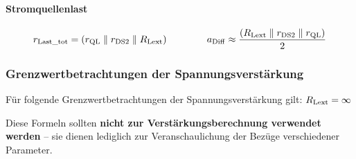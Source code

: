 

\paragraph{Stromquellenlast}    %

\vspace{-0.2cm}



\[
    r_{\rm Last\_tot} =  \left( r_{\rm QL} \parallel r_{\rm DS2} \parallel R_{\rm Lext} \right) \qquad \qquad
    a_{\rm Diff} \approx \frac{ \left( R_{\rm Lext} \parallel r_{\rm DS2} \parallel r_{\rm QL} \right) }{2}
\]



\subsubsection{Grenzwertbetrachtungen der Spannungsverstärkung}

Für folgende Grenzwertbetrachtungen der Spannungsverstärkung gilt: $R_{\rm Lext} = \infty$


\medskip

Diese Formeln sollten \textbf{nicht zur Verstärkungsberechnung verwendet werden} -- sie dienen lediglich zur Veranschaulichung der Bezüge verschiedener Parameter.

